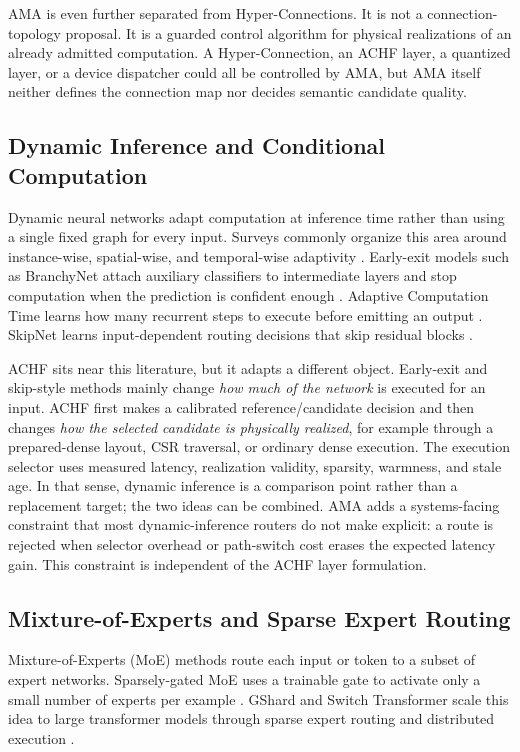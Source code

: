 \documentclass{article}
\newcommand{\achf}{\textsc{ACHF}}
\newcommand{\ama}{\textsc{AMA}}
\begin{document}
\ama{} is even further separated from Hyper-Connections. It is not a
connection-topology proposal. It is a guarded control algorithm for physical
realizations of an already admitted computation. A Hyper-Connection, an
\achf{} layer, a quantized layer, or a device dispatcher could all be controlled
by \ama{}, but \ama{} itself neither defines the connection map nor decides
semantic candidate quality.

\subsection{Dynamic Inference and Conditional Computation}

Dynamic neural networks adapt computation at inference time rather than using a
single fixed graph for every input. Surveys commonly organize this area around
instance-wise, spatial-wise, and temporal-wise adaptivity
\cite{han2021dynamic}. Early-exit models such as BranchyNet attach auxiliary
classifiers to intermediate layers and stop computation when the prediction is
confident enough \cite{teerapittayanon2016branchynet}. Adaptive Computation
Time learns how many recurrent steps to execute before emitting an output
\cite{graves2016adaptive}. SkipNet learns input-dependent routing decisions
that skip residual blocks \cite{wang2018skipnet}.

\achf{} sits near this literature, but it adapts a different object. Early-exit
and skip-style methods mainly change \emph{how much of the network} is executed
for an input. \achf{} first makes a calibrated reference/candidate decision and
then changes \emph{how the selected candidate is physically realized}, for
example through a prepared-dense layout, CSR traversal, or ordinary dense
execution. The execution selector uses measured latency, realization validity,
sparsity, warmness, and stale age. In that sense, dynamic inference is a comparison point
rather than a replacement target; the two ideas can be combined. \ama{} adds a
systems-facing constraint that most dynamic-inference routers do not make
explicit: a route is rejected when selector overhead or path-switch cost erases
the expected latency gain. This constraint is independent of the \achf{} layer
formulation.

\subsection{Mixture-of-Experts and Sparse Expert Routing}

Mixture-of-Experts (MoE) methods route each input or token to a subset of
expert networks. Sparsely-gated MoE uses a trainable gate to activate only a
small number of experts per example \cite{shazeer2017outrageously}. GShard and
Switch Transformer scale this idea to large transformer models through sparse
expert routing and distributed execution \cite{lepikhin2020gshard,
fedus2021switch}.
\end{document}
